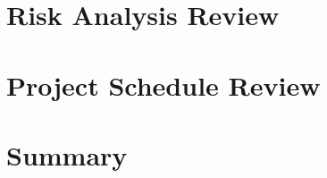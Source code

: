 \documentclass[11pt,a4paper]{article}
\begin{document}

\section{Risk Analysis Review}

\section{Project Schedule Review}

\section{Summary}

\newpage


\end{document}
